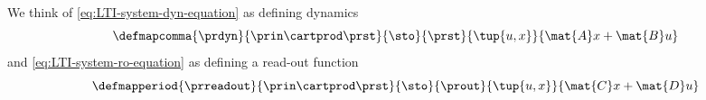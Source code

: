 We think of \cref{eq:LTI-system-dyn-equation} as defining dynamics
\begin{equation}
    \defmapcomma{
        \prdyn
    }{ \prin \cartprod  \prst
    }{ \sto
    }{  \prst
    }{ \tup{u, x}
    }{ \mat{A}x + \mat{B}u
    }
\end{equation}
and \cref{eq:LTI-system-ro-equation} as defining a read-out function
\begin{equation}
    \defmapperiod{
        \prreadout
    }{ \prin \cartprod  \prst
    }{ \sto
    }{  \prout
    }{ \tup{u, x}
    }{ \mat{C}x + \mat{D}u
    }
\end{equation}

